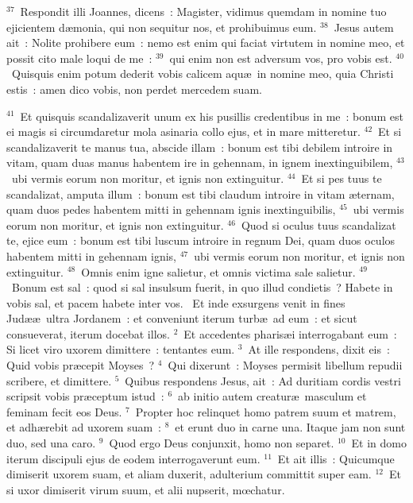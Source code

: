 ${}^{37}$~Respondit illi Joannes, dicens~: Magister, vidimus quemdam in nomine tuo ejicientem d\ae monia, qui non sequitur nos, et prohibuimus eum.
${}^{38}$~Jesus autem ait~: Nolite prohibere eum~: nemo est enim qui faciat virtutem in nomine meo, et possit cito male loqui de me~:
${}^{39}$~qui enim non est adversum vos, pro vobis est.
${}^{40}$~Quisquis enim potum dederit vobis calicem aqu\ae\ in nomine meo, quia Christi estis~: amen dico vobis, non perdet mercedem suam.


${}^{41}$~Et quisquis scandalizaverit unum ex his pusillis credentibus in me~: bonum est ei magis si circumdaretur mola asinaria collo ejus, et in mare mitteretur.
${}^{42}$~Et si scandalizaverit te manus tua, abscide illam~: bonum est tibi debilem introire in vitam, quam duas manus habentem ire in gehennam, in ignem inextinguibilem,
${}^{43}$~ubi vermis eorum non moritur, et ignis non extinguitur.
${}^{44}$~Et si pes tuus te scandalizat, amputa illum~: bonum est tibi claudum introire in vitam \ae ternam, quam duos pedes habentem mitti in gehennam ignis inextinguibilis,
${}^{45}$~ubi vermis eorum non moritur, et ignis non extinguitur.
${}^{46}$~Quod si oculus tuus scandalizat te, ejice eum~: bonum est tibi luscum introire in regnum Dei, quam duos oculos habentem mitti in gehennam ignis,
${}^{47}$~ubi vermis eorum non moritur, et ignis non extinguitur.
${}^{48}$~Omnis enim igne salietur, et omnis victima sale salietur.
${}^{49}$~Bonum est sal~: quod si sal insulsum fuerit, in quo illud condietis~? Habete in vobis sal, et pacem habete inter vos.
~\lettrine[lines=10,image=true,loversize=0.05,lraise=-0.03]{E}{}t inde exsurgens venit in fines Jud\ae \ae\ ultra Jordanem~: et conveniunt iterum turb\ae\ ad eum~: et sicut consueverat, iterum docebat illos.
${}^{2}$~Et accedentes pharis\ae i interrogabant eum~: Si licet viro uxorem dimittere~: tentantes eum.
${}^{3}$~At ille respondens, dixit eis~: Quid vobis pr\ae cepit Moyses~?
${}^{4}$~Qui dixerunt~: Moyses permisit libellum repudii scribere, et dimittere.
${}^{5}$~Quibus respondens Jesus, ait~: Ad duritiam cordis vestri scripsit vobis pr\ae ceptum istud~:
${}^{6}$~ab initio autem creatur\ae\ masculum et feminam fecit eos Deus.
${}^{7}$~Propter hoc relinquet homo patrem suum et matrem, et adh\ae rebit ad uxorem suam~:
${}^{8}$~et erunt duo in carne una. Itaque jam non sunt duo, sed una caro.
${}^{9}$~Quod ergo Deus conjunxit, homo non separet.
${}^{10}$~Et in domo iterum discipuli ejus de eodem interrogaverunt eum.
${}^{11}$~Et ait illis~: Quicumque dimiserit uxorem suam, et aliam duxerit, adulterium committit super eam.
${}^{12}$~Et si uxor dimiserit virum suum, et alii nupserit, mœchatur.


